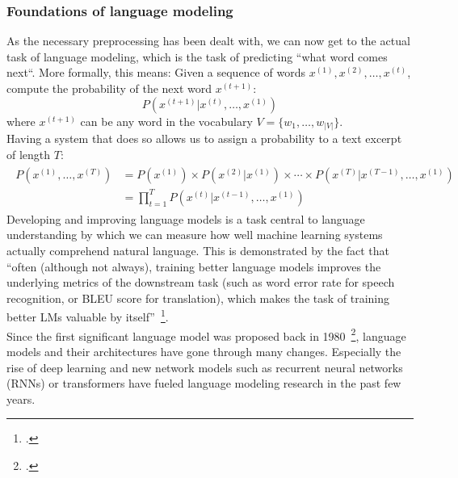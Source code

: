 \subsubsection{Foundations of language modeling}
\label{sub:foundations_of_language_modeling}

As the necessary preprocessing has been dealt with, we can now get to the actual task of language modeling, which is the task of predicting “what word comes next“. More formally, this means: Given a sequence of words $ x^{(1)}, x^{(2)}, \dots, x^{(t)} $, compute the probability of the next word $ x^{(t+1)} $:
\begin{equation}
    P(x^{(t+1)} | x^{(t)}, \dots, x^{(1)})
\end{equation}
where $ x^{(t+1)} $ can be any word in the vocabulary $ V = \{w_1, \dots, w_{|V|}\} $.  \\
Having a system that does so allows us to assign a probability to a text excerpt of length $ T $:
\begin{align}
    \begin{split}
    P(x^{(1)}, \dots, x^{(T)}) &= P(x^{(1)}) \times P(x^{(2)} | x^{(1)}) \times \cdots \times P(x^{(T)} | x^{(T-1)}, \dots, x^{(1)}) \\
    &= \prod_{t=1}^{T} P(x^{(t)} | x^{(t-1)}, \dots, x^{(1)})
    \end{split}
\end{align}
Developing and improving language models is a task central to language understanding by which we can measure how well machine learning systems actually comprehend natural language. This is demonstrated by the fact that “often (although not always), training better language models improves the underlying metrics of the downstream task (such as word error rate for speech recognition, or BLEU score for translation), which makes the task of training better LMs valuable by itself”~\footcite[1]{DBLP:journals/corr/JozefowiczVSSW16}. \\
Since the first significant language model was proposed back in 1980~\footcite{880083}, language models and their architectures have gone through many changes. Especially the rise of deep learning and new network models such as recurrent neural networks (RNNs) or transformers have fueled language modeling research in the past few years.
